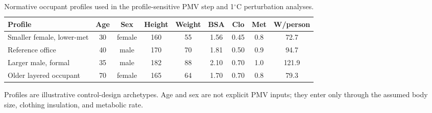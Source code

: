 \begin{table}[t]
\centering
\caption{Normative occupant profiles used in the profile-sensitive PMV step and 1$^\circ$C perturbation analyses.}
\label{tab:profiles}
\begin{adjustbox}{max width=\textwidth}
\begin{tabular}{p{3.1cm}cccccccc}
\toprule
Profile & Age & Sex & Height & Weight & BSA & Clo & Met & W/person \\
\midrule
Smaller female, lower-met & 30 & female & 160 & 55 & 1.56 & 0.45 & 0.8 & 72.7 \\
Reference office & 40 & male & 170 & 70 & 1.81 & 0.50 & 0.9 & 94.7 \\
Larger male, formal & 35 & male & 182 & 88 & 2.10 & 0.70 & 1.0 & 121.9 \\
Older layered occupant & 70 & female & 165 & 64 & 1.70 & 0.70 & 0.8 & 79.3 \\
\bottomrule
\end{tabular}
\end{adjustbox}
\begin{flushleft}\footnotesize Profiles are illustrative control-design archetypes. Age and sex are not explicit PMV inputs; they enter only through the assumed body size, clothing insulation, and metabolic rate.\end{flushleft}
\end{table}
